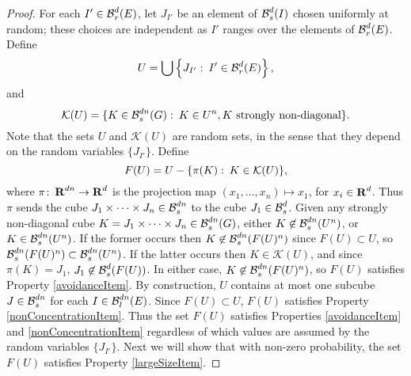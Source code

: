 \begin{proof}
	For each $I' \in \operatorname{\mathcal{B}}_r^d(E)$, let $J_{I'}$ be an element of $\operatorname{\mathcal{B}}^d_s(I)$ chosen uniformly at random; these choices are independent as $I'$ ranges over the elements of $\operatorname{\mathcal{B}}_r^d(E)$. Define
	\[ 	U = \bigcup \left\{ J_{I'} \operatorname{\colon} I' \in \operatorname{\mathcal{B}}_r^d(E) \right\}, \]
	and
	\[ \mathcal{K}(U) = \{ K \in \operatorname{\mathcal{B}}^{dn}_s(G) \operatorname{\colon} K \in U^n, \text{$K$ strongly non-diagonal} \}. \]
	Note that the sets $U$ and $\mathcal{K}(U)$ are random sets, in the sense that they depend on the random variables $\{ J_{I'} \}$. Define
	\begin{equation} \label{defnOfF}
		F(U) = U - \{ \pi(K) \operatorname{\colon} K \in \mathcal{K}(U) \},
	\end{equation}
	where $\pi \colon \operatorname{\mathbf{R}}^{dn} \to \operatorname{\mathbf{R}}^d$ is the projection map $(x_1, \dots, x_n) \mapsto x_1$, for $x_i \in \operatorname{\mathbf{R}}^d$. Thus $\pi$ sends the cube $J_1 \times \dots \times J_n\in \operatorname{\mathcal{B}}^{dn}_s$ to the cube $J_1 \in \operatorname{\mathcal{B}}^d_s$. Given any strongly non-diagonal cube $K = J_1 \times \cdots \times J_n \in \operatorname{\mathcal{B}}_s^{dn}(G)$, either $K \not \in \operatorname{\mathcal{B}}_s^{dn}(U^n)$, or $K \in \operatorname{\mathcal{B}}_s^{dn}(U^n)$. If the former occurs then $K \not \in \operatorname{\mathcal{B}}_s^{dn}(F(U)^n)$ since $F(U) \subset U$, so $\operatorname{\mathcal{B}}_s^{dn}(F(U)^n) \subset \operatorname{\mathcal{B}}_s^{dn}(U^n)$. If the latter occurs then $K \in \mathcal{K}(U)$, and since $\pi(K) = J_1$, $J_1 \not \in \operatorname{\mathcal{B}}_s^d(F(U))$. In either case, $K \not \in \operatorname{\mathcal{B}}_s^{dn}(F(U)^n)$, so $F(U)$ satisfies Property \ref{avoidanceItem}. By construction, $U$ contains at most one subcube $J \in \operatorname{\mathcal{B}}^{dn}_s$ for each $I \in \operatorname{\mathcal{B}}^{dn}_l(E)$. Since $F(U) \subset U$, $F(U)$ satisfies Property \ref{nonConcentrationItem}. Thus the set $F(U)$ satisfies Properties \ref{avoidanceItem} and \ref{nonConcentrationItem} regardless of which values are assumed by the random variables $\{ J_{I'} \}$. Next we will show that with non-zero probability, the set $F(U)$ satisfies Property \ref{largeSizeItem}. 


\end{proof}
